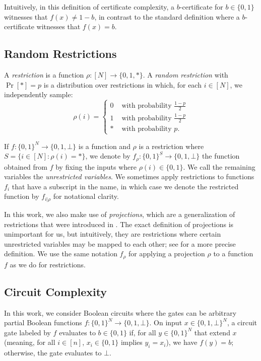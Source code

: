\documentclass[10pt,a4paper]{article}
\begin{document}
Intuitively, in this definition of certificate complexity, a $b$-certificate for $b \in \{0,1\}$ witnesses that $f(x) \neq 1-b$, in contrast to the standard definition where a $b$-certificate witnesses that $f(x)=b$.

\subsection{Random Restrictions}
\label{sec:random_restrictions}
A \textit{restriction} is a function $\rho: [N] \to \{0,1,*\}$. A \textit{random restriction} with $\Pr[*] = p$ is a distribution over restrictions in which, for each $i \in [N]$, we independently sample:
\[
\rho(i) = \begin{cases}
0 & \text{ with probability } \frac{1-p}{2}\\
1 & \text{ with probability } \frac{1-p}{2}\\
* & \text{ with probability } p.
\end{cases}
\]

If $f: \{0,1\}^N \to \{0,1,\bot\}$ is a function and $\rho$ is a restriction where $S = \{i \in [N]: \rho(i) = *\}$, we denote by $f_\rho: \{0,1\}^S \to \{0,1,\bot\}$ the function obtained from $f$ by fixing the inputs where $\rho(i) \in \{0,1\}$. We call the remaining variables the \textit{unrestricted variables}. We sometimes apply restrictions to functions $f_i$ that have a subscript in the name, in which case we denote the restricted function by $f_{i|\rho}$ for notational clarity.

In this work, we also make use of \textit{projections}, which are a generalization of restrictions that were introduced in \cite{HRST17}. The exact definition of projections is unimportant for us, but intuitively, they are restrictions where certain unrestricted variables may be mapped to each other; see \cite{HRST17} for a more precise definition. We use the same notation $f_\rho$ for applying a projection $\rho$ to a function $f$ as we do for restrictions.

\subsection{Circuit Complexity}
\label{sec:circuit_complexity}
In this work, we consider Boolean circuits where the gates can be arbitrary partial Boolean functions $f: \{0,1\}^N \to \{0,1,\bot\}$. On input $x \in \{0,1,\bot\}^N$, a circuit gate labeled by $f$ evaluates to $b \in \{0,1\}$ if, for all $y \in \{0,1\}^N$ that extend $x$ (meaning, for all $i \in [n]$, $x_i \in \{0,1\}$ implies $y_i = x_i$), we have $f(y) = b$; otherwise, the gate evaluates to $\bot$.
\end{document}
